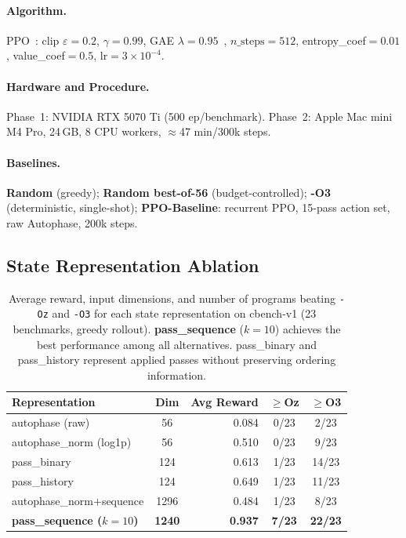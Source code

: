 \documentclass{article}
\begin{document}
\paragraph{Algorithm.}
PPO~\cite{schulman2017proximal}: clip $\varepsilon{=}0.2$, $\gamma{=}0.99$,
GAE $\lambda{=}0.95$~\cite{schulman2015high}, $n\_\text{steps}{=}512$,
entropy\_coef$=0.01$, value\_coef$=0.5$, lr$=3\times10^{-4}$.

\paragraph{Hardware and Procedure.}
Phase~1: NVIDIA RTX 5070 Ti (500 ep/benchmark).
Phase~2: Apple Mac mini M4 Pro, 24\,GB, 8 CPU workers, $\approx$47 min/300k steps.

\paragraph{Baselines.}
\textbf{Random} (greedy); \textbf{Random best-of-56} (budget-controlled);
\textbf{-O3} (deterministic, single-shot);
\textbf{PPO-Baseline}: recurrent PPO, 15-pass action set, raw Autophase, 200k steps.

\subsection{State Representation Ablation}
\label{sec:ablation}

\begin{table}[h]
\centering
\caption{Average reward, input dimensions, and number of programs beating \texttt{-Oz} and \texttt{-O3} for each state representation on cbench-v1 (23 benchmarks, greedy rollout). \textbf{pass\_sequence} ($k{=}10$) achieves the best performance among all alternatives. pass\_binary and pass\_history represent applied passes without preserving ordering information.}
\label{tab:state}

\begin{tabular}{lcrcc}
\toprule
Representation & Dim & Avg Reward & $\geq$Oz & $\geq$O3 \\
\midrule
autophase (raw)          & 56   & 0.084 & 0/23 & 2/23  \\
autophase\_norm (log1p)  & 56   & 0.510 & 0/23 & 9/23  \\
pass\_binary             & 124  & 0.613 & 1/23 & 14/23 \\
pass\_history            & 124  & 0.649 & 1/23 & 11/23 \\
autophase\_norm$+$sequence & 1296 & 0.484 & 1/23 & 8/23  \\
\textbf{pass\_sequence ($k{=}10$)} & \textbf{1240} & \textbf{0.937} & \textbf{7/23} & \textbf{22/23} \\
\bottomrule
\end{tabular}
\end{table}
\end{document}
